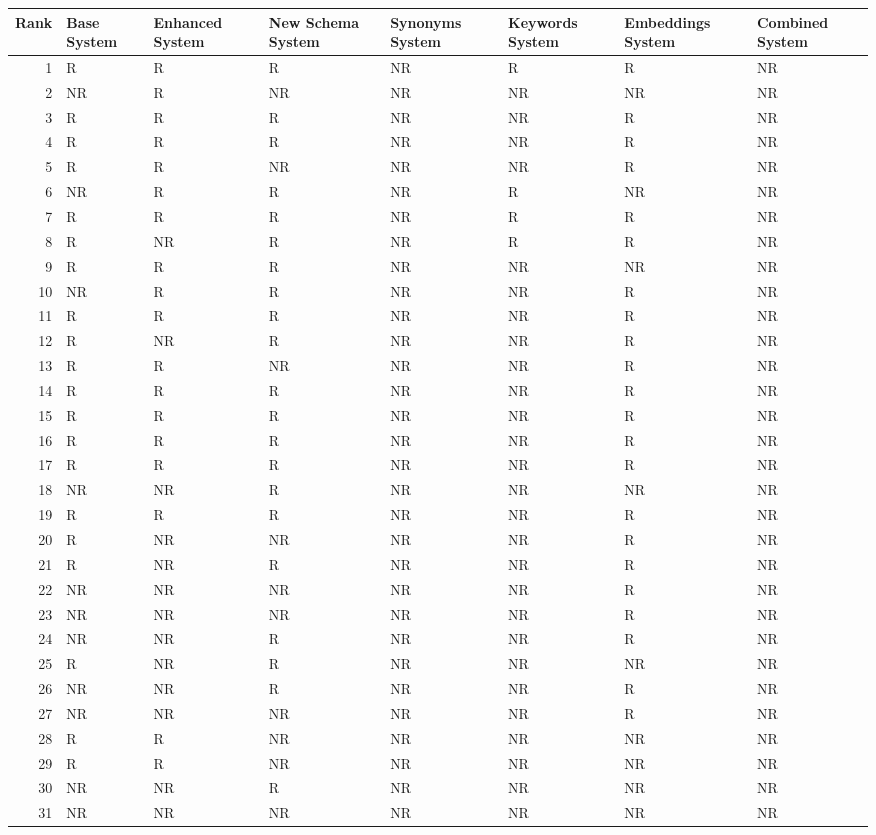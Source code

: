 \begin{tabular}{rlllllll}
\toprule
Rank & Base System & Enhanced System & New Schema System & Synonyms System & Keywords System & Embeddings System & Combined System \\
\midrule
1 & R & R & R & NR & R & R & NR \\
2 & NR & R & NR & NR & NR & NR & NR \\
3 & R & R & R & NR & NR & R & NR \\
4 & R & R & R & NR & NR & R & NR \\
5 & R & R & NR & NR & NR & R & NR \\
6 & NR & R & R & NR & R & NR & NR \\
7 & R & R & R & NR & R & R & NR \\
8 & R & NR & R & NR & R & R & NR \\
9 & R & R & R & NR & NR & NR & NR \\
10 & NR & R & R & NR & NR & R & NR \\
11 & R & R & R & NR & NR & R & NR \\
12 & R & NR & R & NR & NR & R & NR \\
13 & R & R & NR & NR & NR & R & NR \\
14 & R & R & R & NR & NR & R & NR \\
15 & R & R & R & NR & NR & R & NR \\
16 & R & R & R & NR & NR & R & NR \\
17 & R & R & R & NR & NR & R & NR \\
18 & NR & NR & R & NR & NR & NR & NR \\
19 & R & R & R & NR & NR & R & NR \\
20 & R & NR & NR & NR & NR & R & NR \\
21 & R & NR & R & NR & NR & R & NR \\
22 & NR & NR & NR & NR & NR & R & NR \\
23 & NR & NR & NR & NR & NR & R & NR \\
24 & NR & NR & R & NR & NR & R & NR \\
25 & R & NR & R & NR & NR & NR & NR \\
26 & NR & NR & R & NR & NR & R & NR \\
27 & NR & NR & NR & NR & NR & R & NR \\
28 & R & R & NR & NR & NR & NR & NR \\
29 & R & R & NR & NR & NR & NR & NR \\
30 & NR & NR & R & NR & NR & NR & NR \\
31 & NR & NR & NR & NR & NR & NR & NR \\

\end{tabular}
